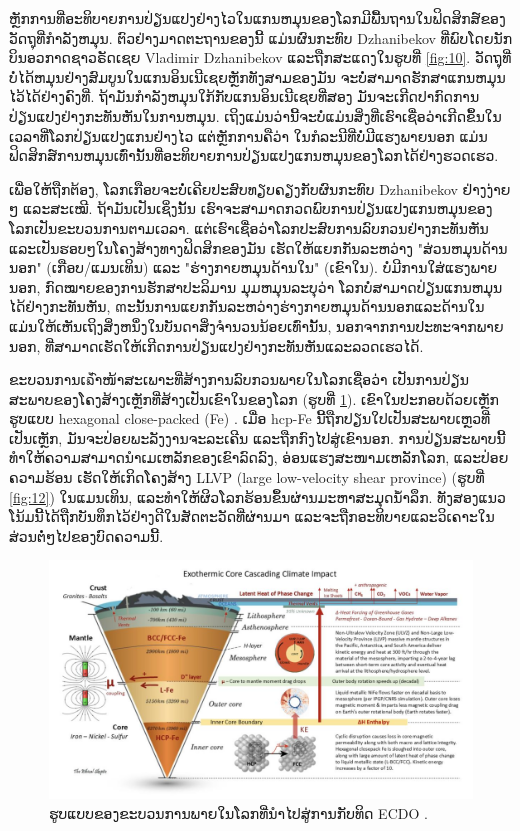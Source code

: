 \documentclass[10pt,twocolumn,letterpaper]{article}
\begin{document}
ຫຼັກການທີ່ອະທິບາຍການປ່ຽນແປງຢ່າງໄວໃນແກນຫມຸນຂອງໂລກມີພື້ນຖານໃນຟິດສິກສ໌ຂອງວັດຖຸທີ່ກຳລັງຫມຸນ. ຕົວຢ່າງມາດຕະຖານຂອງນີ້ ແມ່ນຜົນກະທົບ Dzhanibekov ທີ່ພົບໂດຍນັກບິນອວກາດຊາວຣັດເຊຍ Vladimir Dzhanibekov \cite{37} ແລະຖືກສະແດງໃນຮູບທີ່ \ref{fig:10}. ວັດຖຸທີ່ບໍ່ໄດ້ຫມຸນຢ່າງສົມບູນໃນແກນອິນເນີເຊຍຫຼັກທັງສາມຂອງມັນ ຈະບໍ່ສາມາດຮັກສາແກນຫມຸນໄວ້ໄດ້ຢ່າງຄົງທີ່. ຖ້າມັນກຳລັງຫມຸນໃກ້ກັບແກນອິນເນີເຊຍທີ່ສອງ ມັນຈະເກີດປາກົດການປ່ຽນແປງຢ່າງກະທັນຫັນໃນການຫມຸນ. ເຖິງແມ່ນວ່ານີ້ຈະບໍ່ແມ່ນສິ່ງທີ່ເຮົາເຊື່ອວ່າເກີດຂຶ້ນໃນເວລາທີ່ໂລກປ່ຽນແປງແກນຢ່າງໄວ ແຕ່ຫຼັກການຄືວ່າ ໃນກໍລະນີທີ່ບໍ່ມີແຮງພາຍນອກ ແມ່ນຟິດສິກສ໌ການຫມຸນເທົ່ານັ້ນທີ່ອະທິບາຍການປ່ຽນແປງແກນຫມຸນຂອງໂລກໄດ້ຢ່າງຮວດເຮວ.

ເພື່ອໃຫ້ຖືກຕ້ອງ, ໂລກເກືອບຈະບໍ່ເຄີຍປະສົບທຽບຄຽງກັບຜົນກະທົບ Dzhanibekov ຢ່າງງ່າຍໆ ແລະສະເໝີ. ຖ້າມັນເປັນເຊິ່ງນັ້ນ ເຮົາຈະສາມາດກວດພົບການປ່ຽນແປງແກນຫມຸນຂອງໂລກເປັນຂະບວນການຕາມເວລາ. ແຕ່ເຮົາເຊື່ອວ່າໂລກປະສົບການລົບກວນຢ່າງກະທັນຫັນ ແລະເປັນຮອບໆໃນໂຄງສ້າງທາງຟິດສິກຂອງມັນ ເຮັດໃຫ້ແຍກກັນລະຫວ່າງ "ສ່ວນຫມຸນດ້ານນອກ" (ເກືອບ/ແມນເທິນ) ແລະ "ຮ່າງກາຍຫມຸນດ້ານໃນ" (ເຂົາໃນ). ບໍ່ມີການໃສ່ແຮງພາຍນອກ, ກົດໝາຍຂອງການຮັກສາປະລິມານ ມຸມຫມຸນລະບຸວ່າ ໂລກບໍ່ສາມາດປ່ຽນແກນຫມຸນໄດ້ຢ່າງກະທັນຫັນ, ຓະນັ້ນການແຍກກັນລະຫວ່າງຮ່າງກາຍຫມຸນດ້ານນອກແລະດ້ານໃນ ແມ່ນໃຫ້ເຫັນເຖິງສິ່ງຫນຶ່ງໃນບັນດາສິ່ງຈຳນວນນ້ອຍເທົ່ານັ້ນ, ນອກຈາກການປະທະຈາກພາຍນອກ, ທີ່ສາມາດເຮັດໃຫ້ເກີດການປ່ຽນແປງຢ່າງກະທັນຫັນແລະລວດເຮວໄດ້.

ຂະບວນການເຉົ້າໜ້າສະເພາະທີ່ສ້າງການລົບກວນພາຍໃນໂລກເຊື່ອວ່າ ເປັນການປ່ຽນສະພາບຂອງໂຄງສ້າງເຫຼັກທີ່ສ້າງເປັນເຂົາໃນຂອງໂລກ (ຮູບທີ່ \ref{fig:11}). ເຂົາໃນປະກອບດ້ວຍເຫຼັກຮູບແບບ hexagonal close-packed (Fe) \cite{141}. ເມື່ອ hcp-Fe ນີ້ຖືກປຽນໃປເປັນສະພາບເຫຼວທີ່ເປັນເຫຼັກ, ມັນຈະປ່ອຍພະລັງງານຈະລະເຄີນ ແລະຖືກກົງໄປສູ່ເຂົານອກ. ການປ່ຽນສະພາບນີ້ທຳໃຫ້ຄວາມສາມາດນຳເມເຫລັກຂອງເຂົາລົດລົງ, ອ່ອນແຮງສະໜາມເຫລັກໂລກ, ແລະປ່ອຍຄວາມຮ້ອນ ເຮັດໃຫ້ເກິດໂຄງສ້າງ LLVP (large low-velocity shear province) (ຮູບທີ່ \ref{fig:12}) \cite{38} ໃນແມນເທິນ, ແລະທຳໃຫ້ຜິວໂລກຮ້ອນຂຶ້ນຜ່ານມະຫາສະມຸດນໍ້າລຶກ. ທັງສອງແນວໂນ້ມນີ້ໄດ້ຖືກບັນທຶກໄວ້ຢ່າງດີໃນສັດຕະວັດທີ່ຜ່ານມາ ແລະຈະຖືກອະທິບາຍແລະວິເຄາະໃນສ່ວນຕໍ່ໆໄປຂອງບົດຄວາມນີ້.

\begin{figure}[t]
\begin{center}
\includegraphics[width=1\textwidth]{layers.jpg}
\end{center}

   \caption{ຮູບແບບຂອງຂະບວນການພາຍໃນໂລກທີ່ນຳໄປສູ່ການກັບທິດ ECDO \cite{129}.}
\label{fig:11}
\end{figure}
\end{document}
